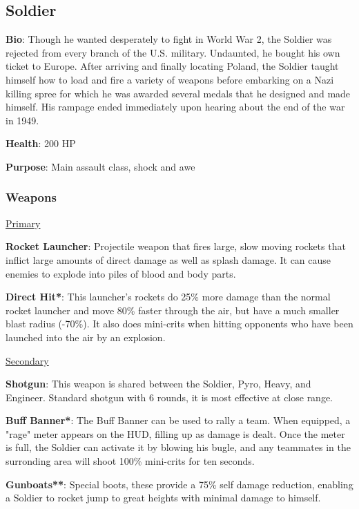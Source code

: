 \subsection{Soldier}
{\bf Bio}:
Though he wanted desperately to fight in World War 2, the Soldier was rejected from every branch of the U.S. military. Undaunted, he bought his own ticket to Europe. After arriving and finally locating Poland, the Soldier taught himself how to load and fire a variety of weapons before embarking on a Nazi killing spree for which he was awarded several medals that he designed and made himself. His rampage ended immediately upon hearing about the end of the war in 1949.

{\bf Health}: 200 HP

{\bf Purpose}:
Main assault class, shock and awe

\subsubsection {Weapons}

\begin {center}
\underline {Primary}
\end {center}

{\bf Rocket Launcher}: Projectile weapon that fires large, slow moving rockets that inflict large amounts of direct damage as well as splash damage. It can cause enemies to explode into piles of blood and body parts. 

{\bf Direct Hit*}: This launcher's rockets do 25\% more damage than the normal rocket launcher and move 80\% faster through the air, but have a much smaller blast radius (-70\%). It also does mini-crits when hitting opponents who have been launched into the air by an explosion.

\begin {center}
\underline {Secondary}
\end {center}

{\bf Shotgun}: This weapon is shared between the Soldier, Pyro, Heavy, and Engineer. Standard shotgun with 6 rounds, it is most effective at close range. 

{\bf Buff Banner*}: The Buff Banner can be used to rally a team.  When equipped, a "rage" meter appears on the HUD, filling up as damage is dealt.  Once the meter is full, the Soldier can activate it by blowing his bugle, and any teammates in the surronding area will shoot 100\% mini-crits for ten seconds.

{\bf Gunboats**}: Special boots, these provide a 75\% self damage reduction, enabling a Soldier to rocket jump to great heights with minimal damage to himself.

